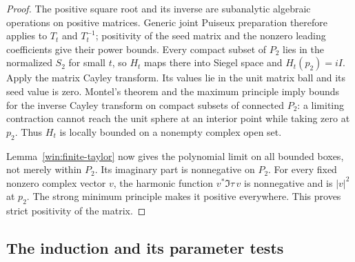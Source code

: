 \begin{proof}
The positive square root and its inverse are subanalytic algebraic
operations on positive matrices.  Generic joint Puiseux preparation
therefore applies to $T_t$ and $T_t^{-1}$; positivity of the seed
matrix and the nonzero leading coefficients give their power bounds.
Every compact subset of $P_2$ lies in the normalized $S_2$ for small
$t$, so $H_t$ maps there into Siegel space and $H_t(p_2)=iI$.
Apply the matrix Cayley transform.  Its values lie in the unit matrix
ball and its seed value is zero.  Montel's theorem and the maximum
principle imply bounds for the inverse Cayley transform on compact
subsets of connected $P_2$: a limiting contraction cannot reach the
unit sphere at an interior point while taking zero at $p_2$.
Thus $H_t$ is locally bounded on a nonempty complex open set.

Lemma~\ref{win:finite-taylor} now gives the polynomial limit on all
bounded boxes, not merely within $P_2$.  Its imaginary part is
nonnegative on $P_2$.  For every fixed nonzero complex vector $v$,
the harmonic function $v^*\Im\tau\,v$ is nonnegative and is
$|v|^2$ at $p_2$.  The strong minimum principle makes it positive
everywhere.  This proves strict positivity of the matrix.
\end{proof}

\subsection{The induction and its parameter tests}

